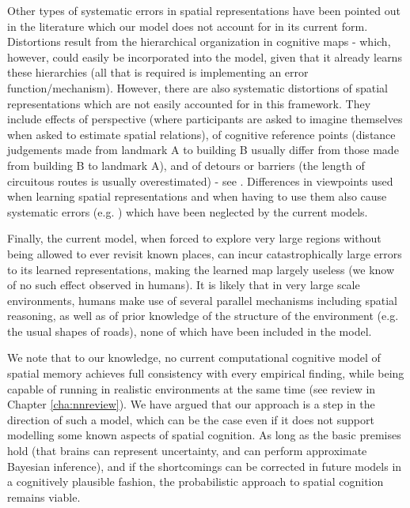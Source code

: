 Other types of systematic errors in spatial representations have been pointed out in the literature which our model does not account for in its current form. Distortions result from the hierarchical organization in cognitive maps \citep{tversky1992distortions,hirtle1985evidence} - which, however, could easily be incorporated into the model, given that it already learns these hierarchies (all that is required is implementing an error function/mechanism). However, there are also systematic distortions of spatial representations which are not easily accounted for in this framework. They include effects of perspective (where participants are asked to imagine themselves when asked to estimate spatial relations), of cognitive reference points (distance judgements made from landmark A to building B usually differ from those made from building B to landmark A), and of detours or barriers (the length of circuitous routes is usually overestimated) - see \citep{tversky1992distortions, tversky2003navigating}. Differences in viewpoints used when learning spatial representations and when having to use them also cause systematic errors (e.g. \citep{shelton2001systems, Shelton2004, burgess2006spatial}) which have been neglected by the current models.

Finally, the current model, when forced to explore very large regions without being allowed to ever revisit known places, can incur catastrophically large errors to its learned representations, making the learned map largely useless (we know of no such effect observed in humans). It is likely that in very large scale environments, humans make use of several parallel mechanisms including spatial reasoning, as well as of prior knowledge of the structure of the environment (e.g. the usual shapes of roads), none of which have been included in the model. 

We note that to our knowledge, no current computational cognitive model of spatial memory achieves full consistency with every empirical finding, while being capable of running in realistic environments at the same time (see review in Chapter \ref{cha:nnreview}). We have argued that our approach is a step in the direction of such a model, which can be the case even if it does not support modelling some known aspects of spatial cognition. As long as the basic premises hold (that brains can represent uncertainty, and can perform approximate Bayesian inference), and if the shortcomings can be corrected in future models in a cognitively plausible fashion, the probabilistic approach to spatial cognition remains viable.


